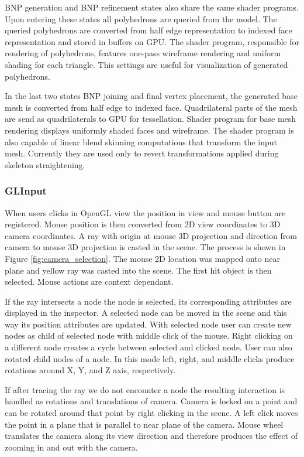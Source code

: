 BNP generation and BNP refinement states also share the same shader programs.
Upon entering these states all polyhedrons are queried from the model.
The queried polyhedrons are converted from half edge representation to indexed face representation and stored in buffers on GPU.
The shader program, responsible for rendering of polyhedrons, features one-pass wireframe rendering and uniform shading for each triangle.
This settings are useful for visualization of generated polyhedrons.

In the last two states BNP joining and final vertex placement, the generated base mesh is converted from half edge to indexed face.
Quadrilateral parts of the mesh are send as quadrilaterals to GPU for tessellation.
Shader program for base mesh rendering displays uniformly shaded faces and wireframe.
The shader program is also capable of linear blend skinning computations that transform the input mesh.
Currently they are used only to revert transformations applied during skeleton straightening.

\subsubsection{GLInput}

When users clicks in OpenGL view the position in view and mouse button are registered.
Mouse position is then converted from 2D view coordinates to 3D camera coordinates.
A ray with origin at mouse 3D projection and direction from camera to mouse 3D projection is casted in the scene.
The process is shown in Figure \ref{fig:camera_selection}.
The mouse 2D location was mapped onto near plane and yellow ray was casted into the scene.
The first hit object is then selected.
Mouse actions are context dependant.

If the ray intersects a node the node is selected, its corresponding attributes are displayed in the inspector.
A selected node can be moved in the scene and this way its position attributes are updated.
With selected node user can create new nodes as child of selected node with middle click of the mouse.
Right clicking on a different node creates a cycle between selected and clicked node.
User can also rotated child nodes of a node.
In this mode left, right, and middle clicks produce rotations around X, Y, and Z axis, respectively.

If after tracing the ray we do not encounter a node the resulting interaction is handled as rotations and translations of camera.
Camera is locked on a point and can be rotated around that point by right clicking in the scene.
A left click moves the point in a plane that is parallel to near plane of the camera.
Mouse wheel translates the camera along its view direction and therefore produces the effect of zooming in and out with the camera.

